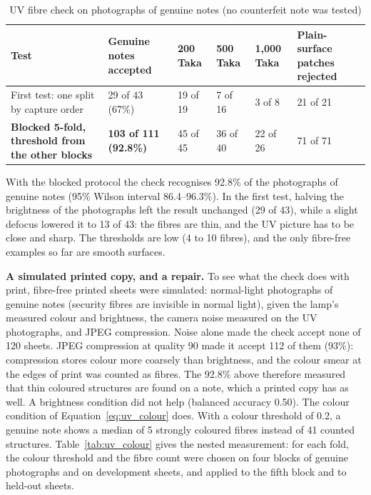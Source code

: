 \begin{table}[!htbp]
\centering
\caption{UV fibre check on photographs of genuine notes (no counterfeit note was tested)}
\label{tab:uv}
\small
\begin{tabular}{|L{4.5cm}|C{2.2cm}|C{1.5cm}|C{1.5cm}|C{1.6cm}|C{1.9cm}|}
\hline
\textbf{Test} & \textbf{Genuine notes accepted} & \textbf{200 Taka} & \textbf{500 Taka} & \textbf{1,000 Taka} & \textbf{Plain-surface patches rejected} \\ \hline
First test: one split by capture order & 29 of 43 (67\%) & 19 of 19 & 7 of 16 & 3 of 8 & 21 of 21 \\ \hline
\textbf{Blocked 5-fold, threshold from the other blocks} & \textbf{103 of 111 (92.8\%)} & 45 of 45 & 36 of 40 & 22 of 26 & 71 of 71 \\ \hline
\end{tabular}
\end{table}

With the blocked protocol the check recognises 92.8\% of the photographs of genuine notes (95\% Wilson interval 86.4--96.3\%). In the first test, halving the brightness of the photographs left the result unchanged (29 of 43), while a slight defocus lowered it to 13 of 43: the fibres are thin, and the UV picture has to be close and sharp. The thresholds are low (4 to 10 fibres), and the only fibre-free examples so far are smooth surfaces.

\textbf{A simulated printed copy, and a repair.} To see what the check does with print, fibre-free printed sheets were simulated: normal-light photographs of genuine notes (security fibres are invisible in normal light), given the lamp's measured colour and brightness, the camera noise measured on the UV photographs, and JPEG compression. Noise alone made the check accept none of 120 sheets. JPEG compression at quality 90 made it accept 112 of them (93\%): compression stores colour more coarsely than brightness, and the colour smear at the edges of print was counted as fibres. The 92.8\% above therefore measured that thin coloured structures are found on a note, which a printed copy has as well. A brightness condition did not help (balanced accuracy 0.50). The colour condition of Equation~\eqref{eq:uv_colour} does. With a colour threshold of 0.2, a genuine note shows a median of 5 strongly coloured fibres instead of 41 counted structures. Table~\ref{tab:uv_colour} gives the nested measurement: for each fold, the colour threshold and the fibre count were chosen on four blocks of genuine photographs and on development sheets, and applied to the fifth block and to held-out sheets.

